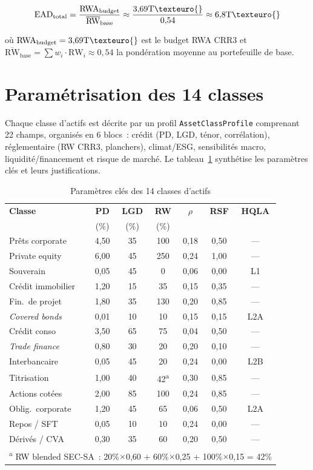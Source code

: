 \documentclass[12pt, a4paper, twoside, openright]{report}
\theoremstyle{definition}
\begin{document}
\begin{equation}
\text{EAD}_{\text{total}} = \frac{\text{RWA}_{\text{budget}}}{\overline{\text{RW}}_{\text{base}}} \approx \frac{3{,}69 \text{T}\texteuro{}}{0{,}54} \approx 6{,}8 \text{T}\texteuro{}
\label{eq:total-ead}
\end{equation}

\noindent où $\text{RWA}_{\text{budget}} = 3{,}69\text{T}\texteuro{}$ est le budget RWA CRR3 et $\overline{\text{RW}}_{\text{base}} = \sum w_i \cdot \text{RW}_i \approx 0{,}54$ la pondération moyenne au portefeuille de base.


\section{Paramétrisation des 14 classes}
\label{sec:multi-params}

Chaque classe d'actifs est décrite par un profil \texttt{AssetClassProfile} comprenant 22 champs, organisés en 6 blocs~: crédit (PD, LGD, ténor, corrélation), réglementaire (RW CRR3, planchers), climat/ESG, sensibilités macro, liquidité/financement et risque de marché. Le tableau~\ref{tab:params-14} synthétise les paramètres clés et leurs justifications.

\begin{table}[htbp]
\centering
\small
\caption{Paramètres clés des 14 classes d'actifs}
\label{tab:params-14}
\begin{tabular}{lcccccc}
\toprule
\textbf{Classe} & \textbf{PD} & \textbf{LGD} & \textbf{RW} & $\rho$ & \textbf{RSF} & \textbf{HQLA} \\
 & (\%) & (\%) & (\%) & & & \\
\midrule
Prêts corporate & 4,50 & 35 & 100 & 0,18 & 0,50 & --- \\
Private equity & 6,00 & 45 & 250 & 0,24 & 1,00 & --- \\
Souverain & 0,05 & 45 & 0 & 0,06 & 0,00 & L1 \\
Crédit immobilier & 1,20 & 15 & 35 & 0,15 & 0,35 & --- \\
Fin.\ de projet & 1,80 & 35 & 130 & 0,20 & 0,85 & --- \\
\textit{Covered bonds} & 0,01 & 10 & 10 & 0,15 & 0,15 & L2A \\
Crédit conso & 3,50 & 65 & 75 & 0,04 & 0,50 & --- \\
\textit{Trade finance} & 0,80 & 30 & 20 & 0,20 & 0,10 & --- \\
Interbancaire & 0,05 & 45 & 20 & 0,24 & 0,00 & L2B \\
Titrisation & 1,00 & 40 & 42\textsuperscript{a} & 0,30 & 0,85 & --- \\
Actions cotées & 2,00 & 85 & 100 & 0,24 & 0,85 & --- \\
Oblig.\ corporate & 1,20 & 45 & 65 & 0,06 & 0,50 & L2A \\
Repos / SFT & 0,05 & 10 & 10 & 0,24 & 0,00 & --- \\
Dérivés / CVA & 0,30 & 35 & 60 & 0,20 & 0,50 & --- \\
\bottomrule
\multicolumn{7}{l}{\footnotesize \textsuperscript{a} RW blended SEC-SA~: 20\%$\times$0,60 + 60\%$\times$0,25 + 100\%$\times$0,15 = 42\%}
\end{tabular}
\end{table}
\end{document}
